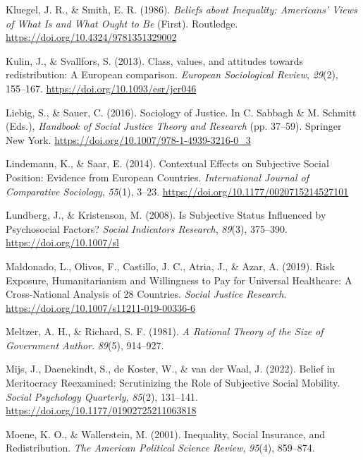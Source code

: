 \documentclass[
  12pt,
]{book}
\newlength{\cslhangindent}
\newenvironment{cslreferences}%
  {\setlength{\parindent}{0pt}%
  \everypar{\setlength{\hangindent}{\cslhangindent}}\ignorespaces}%
  {\par}
\begin{document}
\begin{cslreferences}
\leavevmode\hypertarget{ref-Kluegel-Smith1986}{}%
Kluegel, J. R., \& Smith, E. R. (1986). \emph{Beliefs about Inequality: Americans' Views of What Is and What Ought to Be} (First). Routledge. \url{https://doi.org/10.4324/9781351329002}

\leavevmode\hypertarget{ref-Kulin2013}{}%
Kulin, J., \& Svallfors, S. (2013). Class, values, and attitudes towards redistribution: A European comparison. \emph{European Sociological Review}, \emph{29}(2), 155--167. \url{https://doi.org/10.1093/esr/jcr046}

\leavevmode\hypertarget{ref-Liebig-Sauer2016}{}%
Liebig, S., \& Sauer, C. (2016). Sociology of Justice. In C. Sabbagh \& M. Schmitt (Eds.), \emph{Handbook of Social Justice Theory and Research} (pp. 37--59). Springer New York. \url{https://doi.org/10.1007/978-1-4939-3216-0_3}

\leavevmode\hypertarget{ref-Lindemann2014}{}%
Lindemann, K., \& Saar, E. (2014). Contextual Effects on Subjective Social Position: Evidence from European Countries. \emph{International Journal of Comparative Sociology}, \emph{55}(1), 3--23. \url{https://doi.org/10.1177/0020715214527101}

\leavevmode\hypertarget{ref-Lundberg2008}{}%
Lundberg, J., \& Kristenson, M. (2008). Is Subjective Status Influenced by Psychosocial Factors? \emph{Social Indicators Research}, \emph{89}(3), 375--390. \url{https://doi.org/10.1007/sl}

\leavevmode\hypertarget{ref-Maldonadoetal2019}{}%
Maldonado, L., Olivos, F., Castillo, J. C., Atria, J., \& Azar, A. (2019). Risk Exposure, Humanitarianism and Willingness to Pay for Universal Healthcare: A Cross-National Analysis of 28 Countries. \emph{Social Justice Research}. \url{https://doi.org/10.1007/s11211-019-00336-6}

\leavevmode\hypertarget{ref-Meltzer81}{}%
Meltzer, A. H., \& Richard, S. F. (1981). \emph{A Rational Theory of the Size of Government Author}. \emph{89}(5), 914--927.

\leavevmode\hypertarget{ref-mijs_belief_2022}{}%
Mijs, J., Daenekindt, S., de Koster, W., \& van der Waal, J. (2022). Belief in Meritocracy Reexamined: Scrutinizing the Role of Subjective Social Mobility. \emph{Social Psychology Quarterly}, \emph{85}(2), 131--141. \url{https://doi.org/10.1177/01902725211063818}

\leavevmode\hypertarget{ref-moene_inequality_2001}{}%
Moene, K. O., \& Wallerstein, M. (2001). Inequality, Social Insurance, and Redistribution. \emph{The American Political Science Review}, \emph{95}(4), 859--874.


\end{cslreferences}
\end{document}
